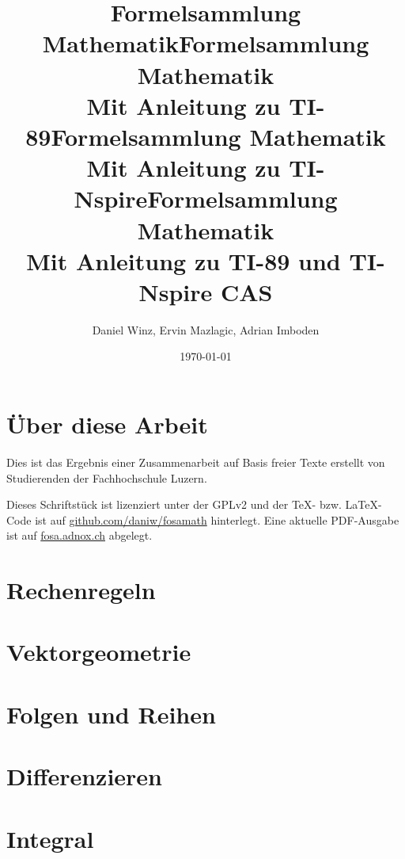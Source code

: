 \documentclass[a5paper,10pt,fleqn]{book}
\title{Formelsammlung Mathematik}
\title{Formelsammlung Mathematik \\ Mit Anleitung zu TI-89}
\title{Formelsammlung Mathematik \\ Mit Anleitung zu TI-Nspire}
\title{Formelsammlung Mathematik \\ Mit Anleitung zu TI-89 und TI-Nspire CAS}
\author{Daniel Winz, Ervin Mazlagic, Adrian Imboden}
\date{\today}
\begin{document}
\maketitle

\chapter*{Über diese Arbeit}
Dies ist das Ergebnis einer Zusammenarbeit auf Basis freier Texte erstellt von Studierenden der Fachhochschule Luzern. 

Dieses Schriftstück ist lizenziert unter der GPLv2 und der \TeX-  bzw. \LaTeX- Code ist auf \url{github.com/daniw/fosamath} hinterlegt.
Eine aktuelle PDF-Ausgabe ist auf \url{fosa.adnox.ch} abgelegt. 


\tableofcontents

\chapter{Rechenregeln}



\chapter{Vektorgeometrie}


\chapter{Folgen und Reihen}



\chapter{Differenzieren}




\chapter{Integral}






\end{document}

